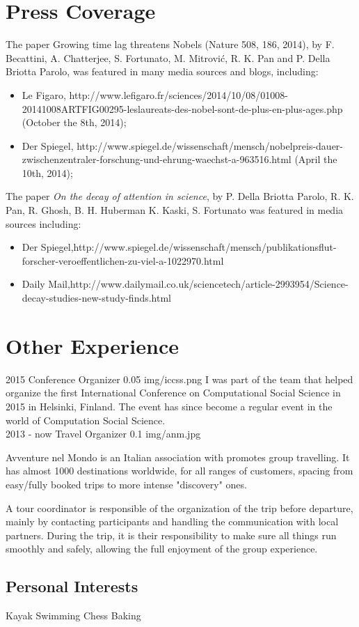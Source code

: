 \documentclass[]{friggeri-cv}
\begin{document}
\section{Press Coverage}

The paper Growing time lag threatens Nobels (Nature 508, 186, 2014), by F. Becattini, A.
Chatterjee, S. Fortunato, M. Mitrović, R. K. Pan and P. Della Briotta Parolo, was featured in many
media sources and blogs, including:

\begin{itemize}
\item Le Figaro, http://www.lefigaro.fr/sciences/2014/10/08/01008-20141008ARTFIG00295-leslaureats-des-nobel-sont-de-plus-en-plus-ages.php
(October the 8th, 2014);
\item Der Spiegel, http://www.spiegel.de/wissenschaft/mensch/nobelpreis-dauer-zwischenzentraler-forschung-und-ehrung-waechst-a-963516.html
(April the 10th, 2014);
\end{itemize}

The paper \textit{On the decay of attention in science}, by P. Della Briotta Parolo, R. K. Pan, R. Ghosh, B. H. Huberman
K. Kaski, S. Fortunato was featured in media sources including:
\begin{itemize}
\item Der Spiegel,​ http://www.spiegel.de/wissenschaft/mensch/publikationsflut-forscher-veroeffentlichen-zu-viel-a-1022970.html
\item Daily Mail, ​http://www.dailymail.co.uk/sciencetech/article-2993954/Science-decay-studies-new-study-finds.html​
\end{itemize}

\newpage


\section{Other Experience}

\begin{entrylist}

\work
{2015}
{Conference Organizer}
{0.05}
{img/iccss.png}
{I was part of the team that helped organize the first International Conference on Computational Social Science in 2015 in Helsinki, Finland. The event has since become a regular event in the world of Computation Social Science.
}
\\

\work
{2013 - now}
{Travel Organizer}
{0.1}
{img/anm.jpg}
{Avventure nel Mondo is an Italian association with promotes group travelling. It has almost 1000 destinations worldwide, for all ranges of customers, spacing from easy/fully booked trips to more intense "discovery" ones.

A tour coordinator is responsible of the organization of the trip before departure, mainly by contacting participants and handling the communication with local partners. During the trip, it is their responsibility to make sure all things run smoothly and safely, allowing the full enjoyment of the group experience.}


\end{entrylist}

\begin{aside}
  \section{Personal Interests}
Kayak
Swimming
Chess
Baking
\end{aside}
\end{document}
